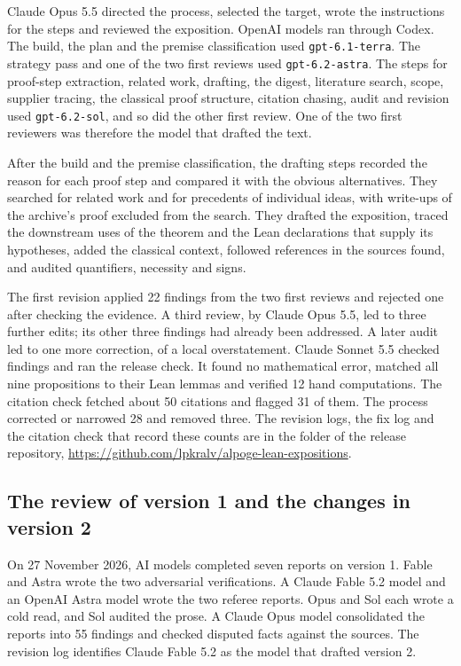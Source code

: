 \documentclass[11pt]{amsart}
\theoremstyle{definition}
\theoremstyle{remark}
\begin{document}
Claude Opus 5.5 directed the process, selected the target, wrote the
instructions for the steps and reviewed the exposition. OpenAI models ran
through Codex. The build, the plan and the premise classification used
\texttt{gpt-6.1-terra}. The strategy pass and one of the two first reviews
used \texttt{gpt-6.2-astra}. The steps for proof-step extraction, related
work, drafting, the digest, literature search, scope, supplier tracing, the
classical proof structure, citation chasing, audit and revision used
\texttt{gpt-6.2-sol}, and so did the other first review. One of the two first
reviewers was therefore the model that drafted the text.

After the build and the premise classification, the drafting steps recorded
the reason for each proof step and compared it with the obvious
alternatives. They searched for related work and for precedents of
individual ideas, with write-ups of the archive's proof excluded from the
search. They drafted the exposition, traced the downstream uses of the
theorem and the Lean declarations that supply its hypotheses, added the
classical context, followed references in the sources found, and audited
quantifiers, necessity and signs.

The first revision applied 22 findings from the two first reviews and
rejected one after checking the evidence. A third review, by Claude Opus
5.5, led to three further edits; its other three findings had already been
addressed. A later audit led to one more correction, of a local
overstatement. Claude Sonnet 5.5 checked findings and ran the release check.
It found no mathematical error, matched all nine propositions to their Lean
lemmas and verified 12 hand computations. The citation check fetched about
50 citations and flagged 31 of them. The process corrected or narrowed 28
and removed three. The revision logs, the fix log and the citation check
that record these counts are in the folder  of
the release repository,
\url{https://github.com/lpkralv/alpoge-lean-expositions}.

\subsection{The review of version 1 and the changes in version 2}

On 27 November 2026, AI models completed seven reports on version 1.
Fable and Astra wrote the two adversarial verifications. A Claude Fable
5.2 model and an OpenAI Astra model wrote the two referee reports. Opus
and Sol each wrote a cold read, and Sol audited the prose. A Claude Opus
model consolidated the reports into 55 findings and checked disputed
facts against the sources. The revision log identifies Claude Fable 5.2
as the model that drafted version 2.
\end{document}
